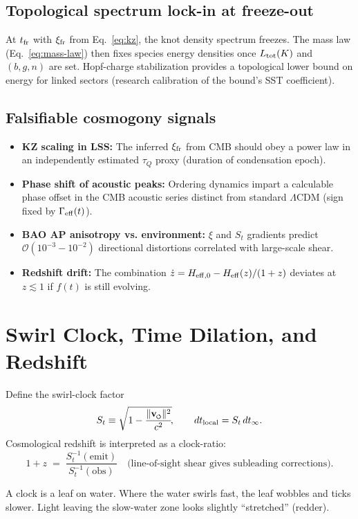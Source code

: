 \documentclass[10pt,reprint,aps,onecolumn,nofootinbib]{revtex4-2}
\newcommand{\swirlarrow}{%
    \mathchoice{\mkern-2mu\scriptstyle\boldsymbol{\circlearrowleft}}%
    {\mkern-2mu\scriptstyle\boldsymbol{\circlearrowleft}}%
    {\mkern-2mu\scriptscriptstyle\boldsymbol{\circlearrowleft}}%
    {\mkern-2mu\scriptscriptstyle\boldsymbol{\circlearrowleft}}%
}
\newcommand{\vswirl}{\mathbf{v}_{\swirlarrow}}
\newcommand{\vnorm}{\lVert \vswirl \rVert}
\begin{document}
\subsection*{Topological spectrum lock-in at freeze-out}
At \(t_{\rm fr}\) with \(\xi_{\rm fr}\) from Eq.~\eqref{eq:kz}, the knot density spectrum freezes.
The mass law (Eq.~\eqref{eq:mass-law}) then fixes species energy densities once \(L_{\rm tot}(K)\) and \((b,g,n)\) are set.
Hopf-charge stabilization provides a topological lower bound on energy for linked sectors (research calibration of the bound’s SST coefficient). %

\subsection*{Falsifiable cosmogony signals}
\begin{tcolorbox}[colback=white,colframe=black,title=Predictions specific to cosmogony]
\begin{itemize}\itemsep2pt
\item \textbf{KZ scaling in LSS:} The inferred \(\xi_{\rm fr}\) from CMB should obey a power law in an independently estimated \(\tau_Q\) proxy (duration of condensation epoch).
\item \textbf{Phase shift of acoustic peaks:} Ordering dynamics impart a calculable phase offset in the CMB acoustic series distinct from standard \(\Lambda\)CDM (sign fixed by \(\Gamma_{\rm eff}(t)\)).
\item \textbf{BAO AP anisotropy vs. environment:} \(\xi\) and \(S_t\) gradients predict \(\mathcal{O}(10^{-3}\!-\!10^{-2})\) directional distortions correlated with large-scale shear.
\item \textbf{Redshift drift:} The combination \(\dot z = H_{{\rm eff},0}-H_{\rm eff}(z)/(1+z)\) deviates at \(z\!\lesssim\!1\) if \(f(t)\) is still evolving.
\end{itemize}
\end{tcolorbox}

\section*{Swirl Clock, Time Dilation, and Redshift}
Define the swirl-clock factor
\[
S_t \equiv \sqrt{1-\frac{\vnorm^2}{c^2}}\!,
\qquad
dt_{\mathrm{local}} = S_t\, dt_{\infty}.
\]
Cosmological redshift is interpreted as a clock-ratio:
\[
1+z \;=\; \frac{S_t^{-1}(\mathrm{emit})}{S_t^{-1}(\mathrm{obs})}
\quad\text{(line-of-sight shear gives subleading corrections).}
\]
    \begin{analogynote}
    A clock is a leaf on water. Where the water swirls fast, the leaf wobbles and ticks slower. Light leaving the slow-water zone looks slightly ``stretched'' (redder).
    \end{analogynote}
\end{document}
